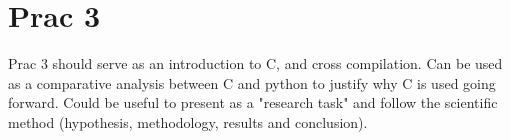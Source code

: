 \section{Prac 3}
Prac 3 should serve as an introduction to C, and cross compilation. Can be used as a comparative analysis between C and python to justify why C is used going forward. Could be useful to present as a "research task" and follow the scientific method (hypothesis, methodology, results and conclusion).
